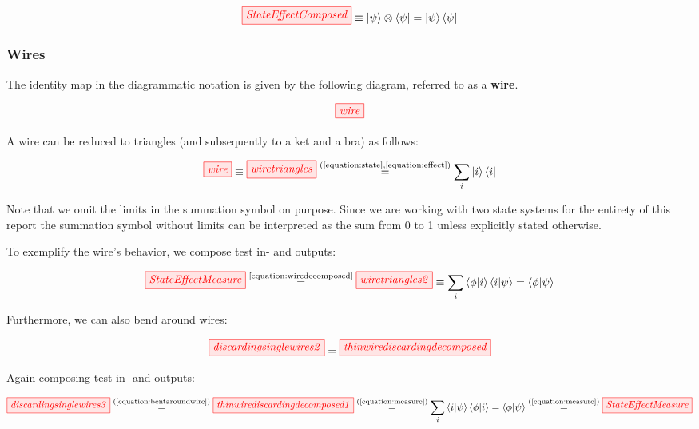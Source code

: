 \documentclass[]{article}
\newcommand{\equaltext}[1]{\ensuremath{\stackrel{\text{#1}}{=}}}
\begin{document}
\begin{equation}
	\tikzfig{StateEffectComposed} \equiv \ket{\psi}\otimes\bra{\psi} = \ket{\psi}\bra{\psi}
\end{equation}


\subsubsection{Wires}
\label{identity}
The identity map in the diagrammatic notation is given by the following diagram, referred to as a \textbf{wire}.

\begin{equation}
\tikzfig{wire}
\end{equation}

A wire can be reduced to triangles (and subsequently to a ket and a bra) as follows: 

\begin{equation}
\label{equation:wiredecomposed}
\tikzfig{wire} \equiv \tikzfig{wiretriangles} \equaltext{(\ref{equation:state},\ref{equation:effect})} \sum_{i}\ket{i}\bra{i}
\end{equation}

Note that we omit the limits in the summation symbol on purpose. Since we are working with two state systems for the entirety of this report the summation symbol without limits can be interpreted as the sum from 0 to 1 unless explicitly stated otherwise. 

To exemplify the wire's behavior, we compose test in- and outputs:

\begin{equation}
\label{equation:measure}
\tikzfig{StateEffectMeasure} \equaltext{\ref{equation:wiredecomposed}}  \tikzfig{wiretriangles2} \equiv \sum_{i}\bra{\phi}\ket{i}\bra{i}\ket{\psi} = \bra{\phi}\ket{\psi}
\end{equation}

Furthermore, we can also bend around wires:

\begin{equation}
\label{equation:bentaroundwire}
\tikzfig{discardingsinglewires2} \equiv
\tikzfig{thinwirediscardingdecomposed} 
\end{equation}

Again composing test in- and outputs:

\begin{equation}
\label{equation:bentaroundwiresinandoutputs}
\tikzfig{discardingsinglewires3} \equaltext{(\ref{equation:bentaroundwire})} \tikzfig{thinwirediscardingdecomposed1} \equaltext{(\ref{equation:measure})} \sum_{i}\bra{i}\ket{\psi}\bra{\phi}\ket{i} = \bra{\phi}\ket{\psi} \equaltext{(\ref{equation:measure})} \tikzfig{StateEffectMeasure}
\end{equation}
\end{document}
